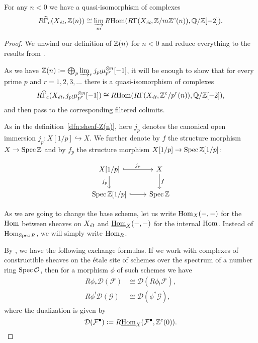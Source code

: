 \documentclass{article}
\numberwithin{equation}{section}
\begin{document}
\begin{proposition}
  For any $n < 0$ we have a quasi-isomorphism of complexes
  \begin{equation}
    \label{eqn:duality-quasi-isomorphism-1}
    R\widehat{\Gamma}_c (X_\et, \ZZ (n)) \cong
    \varinjlim_m \RHom (R\Gamma (X_\et, \ZZ/m\ZZ^c (n)), \QQ/\ZZ [-2]).
  \end{equation}

  \begin{proof}
    We unwind our definition of $\ZZ (n)$ for $n < 0$ and reduce everything to
    the results from \cite{Geisser-2010}.

    \vspace{1em}

    As we have
    $\ZZ (n) \dfn \bigoplus_p \varinjlim_r j_{p!} \mu_{p^r}^{\otimes n} [-1]$,
    it will be enough to show that for every prime $p$ and $r=1,2,3,\ldots$
    there is a quasi-isomorphism of complexes
    \[ R\widehat{\Gamma}_c (X_\et, j_{p!} \mu_{p^r}^{\otimes n} [-1]) \cong
    \RHom (R\Gamma (X_\et, \ZZ^c/p^r (n)), \QQ/\ZZ [-2]), \]
    and then pass to the corresponding filtered colimits.

    As in the definition~\ref{dfn:sheaf-Z(n)}, here $j_p$ denotes the canonical
    open immersion $j_p\colon X[1/p] \hookrightarrow X$. We further denote by
    $f$ the structure morphism $X\to \Spec \ZZ$ and by $f_p$ the structure
    morphism $X [1/p] \to \Spec \ZZ [1/p]$:

    \[ \begin{tikzcd}
      X [1/p]\ar[hookrightarrow]{r}{j_p}\ar{d}[swap]{f_p} & X\ar{d}{f} \\
      \Spec \ZZ [1/p]\ar[hookrightarrow]{r} & \Spec \ZZ
    \end{tikzcd} \]

    As we are going to change the base scheme, let us write $\Hom_X (-,-)$ for
    the $\Hom$ between sheaves on $X_\et$ and $\iHom_X (-,-)$ for the
    internal $\Hom$. Instead of $\Hom_{\Spec R}$, we will simply write
    $\Hom_R$.

    By \cite[Proposition~7.10~(c)]{Geisser-2010}, we have the following
    exchange formulas. If we work with complexes of constructible sheaves on the
    étale site of schemes over the spectrum of a number ring
    $\Spec\mathcal{O}$, then for a morphism $\phi$ of such schemes we have
    \begin{align}
      \label{eqn:exchange-formula-1} R \phi_* \mathcal{D} (\mathcal{F}) & \cong \mathcal{D} (R \phi_! \mathcal{F}),\\
      \label{eqn:exchange-formula-2} R \phi^! \mathcal{D} (\mathcal{G}) & \cong \mathcal{D} (\phi^* \mathcal{G}),
    \end{align}
    where the dualization is given by
    \[ \mathcal{D} (\mathcal{F}^\bullet) \dfn
    R\iHom_X (\mathcal{F}^\bullet, \ZZ^c (0)). \]


\end{proof}
\end{proposition}
\end{document}
